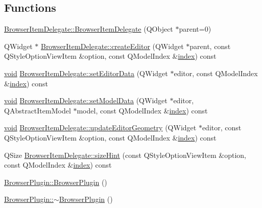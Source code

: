 \subsection*{Functions}
\begin{DoxyCompactItemize}
\item 
\hyperlink{group___u_a_v_object_browser_plugin_gacfb0653f39791c3fb6b7b59ce4de990c}{Browser\-Item\-Delegate\-::\-Browser\-Item\-Delegate} (Q\-Object $\ast$parent=0)
\item 
Q\-Widget $\ast$ \hyperlink{group___u_a_v_object_browser_plugin_ga16c2a6f63557c8fe5ade68a4b8f43009}{Browser\-Item\-Delegate\-::create\-Editor} (Q\-Widget $\ast$parent, const Q\-Style\-Option\-View\-Item \&option, const Q\-Model\-Index \&\hyperlink{glext_8h_ab47dd9958bcadea08866b42bf358e95e}{index}) const 
\item 
\hyperlink{group___u_a_v_objects_plugin_ga444cf2ff3f0ecbe028adce838d373f5c}{void} \hyperlink{group___u_a_v_object_browser_plugin_ga07845c2f048ab9c2344102bbfb627b01}{Browser\-Item\-Delegate\-::set\-Editor\-Data} (Q\-Widget $\ast$editor, const Q\-Model\-Index \&\hyperlink{glext_8h_ab47dd9958bcadea08866b42bf358e95e}{index}) const 
\item 
\hyperlink{group___u_a_v_objects_plugin_ga444cf2ff3f0ecbe028adce838d373f5c}{void} \hyperlink{group___u_a_v_object_browser_plugin_ga14d19cdeeb41b7891318f803d87fa585}{Browser\-Item\-Delegate\-::set\-Model\-Data} (Q\-Widget $\ast$editor, Q\-Abstract\-Item\-Model $\ast$model, const Q\-Model\-Index \&\hyperlink{glext_8h_ab47dd9958bcadea08866b42bf358e95e}{index}) const 
\item 
\hyperlink{group___u_a_v_objects_plugin_ga444cf2ff3f0ecbe028adce838d373f5c}{void} \hyperlink{group___u_a_v_object_browser_plugin_gaf2e600876c101b4bf562057c6aeeade1}{Browser\-Item\-Delegate\-::update\-Editor\-Geometry} (Q\-Widget $\ast$editor, const Q\-Style\-Option\-View\-Item \&option, const Q\-Model\-Index \&\hyperlink{glext_8h_ab47dd9958bcadea08866b42bf358e95e}{index}) const 
\item 
Q\-Size \hyperlink{group___u_a_v_object_browser_plugin_gaed46b06e0a245805247c1be3c62f97ee}{Browser\-Item\-Delegate\-::size\-Hint} (const Q\-Style\-Option\-View\-Item \&option, const Q\-Model\-Index \&\hyperlink{glext_8h_ab47dd9958bcadea08866b42bf358e95e}{index}) const 
\item 
\hyperlink{group___u_a_v_object_browser_plugin_ga63db697e4bb11742d9d946ca7c08fb7a}{Browser\-Plugin\-::\-Browser\-Plugin} ()
\item 
\hyperlink{group___u_a_v_object_browser_plugin_ga35e9b6db09f29a19459f9012c2251980}{Browser\-Plugin\-::$\sim$\-Browser\-Plugin} ()

\end{DoxyCompactItemize}

